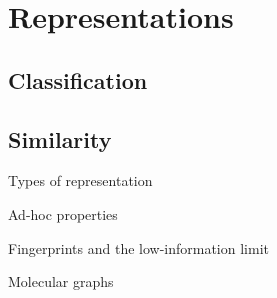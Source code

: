 
\section{Representations}
\subsection{Classification}
%
%
\subsection{Similarity}
%
%
%
\begin{frame}{Types of representation}

\end{frame}
\begin{frame}{Ad-hoc properties}

\end{frame}
\begin{frame}{Fingerprints and the low-information limit}

\end{frame}
\begin{frame}{Molecular graphs}

\end{frame}
%
%
%

